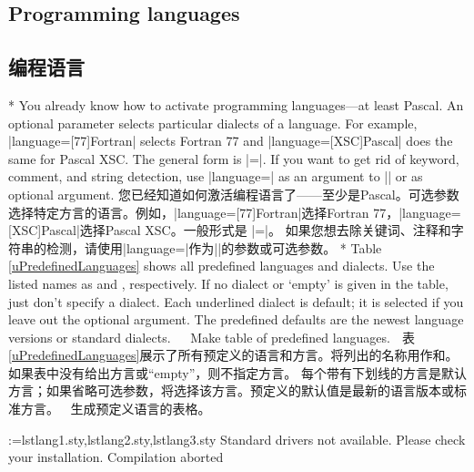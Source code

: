 \begin{paracol}{2}
\subsection{Programming languages}\label{uProgrammingLanguages}
\switchcolumn
\subsection{编程语言}
\switchcolumn[0]*%
You already know how to activate programming languages---at least Pascal.
An optional parameter selects particular dialects of a language. For example,
|language=[77]Fortran| selects Fortran 77 and |language=[XSC]Pascal| does the
same for Pascal XSC. The general form is
   {\rstyle{}}|=|.
If you want to get rid of keyword, comment, and string detection, use
|language={}| as an argument to |\lstset| or as optional argument.
\switchcolumn
您已经知道如何激活编程语言了——至少是Pascal。可选参数选择特定方言的语言。例如，|language=[77]Fortran|选择Fortran 77，|language=[XSC]Pascal|选择Pascal XSC。一般形式是
{\rstyle{}}|=|。
如果您想去除关键词、注释和字符串的检测，请使用|language={}|作为|\lstset|的参数或可选参数。
\switchcolumn[0]*%
Table \ref{uPredefinedLanguages} shows all predefined languages and dialects.
Use the listed names as  and , respectively. If
no dialect or `empty' is given in the table, just don't specify a dialect.
Each underlined dialect is default; it is selected if you leave out
the optional argument. The predefined defaults are the newest language
versions or standard dialects.
^^A
^^A  Make table of predefined languages.
^^A
\switchcolumn
表\ref{uPredefinedLanguages}展示了所有预定义的语言和方言。将列出的名称用作和。如果表中没有给出方言或“empty”，则不指定方言。
每个带有下划线的方言是默认方言；如果省略可选参数，将选择该方言。预定义的默认值是最新的语言版本或标准方言。
^^A
^^A 生成预定义语言的表格。
^^A
\end{paracol}
\let\lstlanguages\empty
\makeatletter
\@for\lst@temp:={lstlang1.sty,lstlang2.sty,lstlang3.sty}\do
   {\IfFileExists\lst@temp{}{\let\lstlanguages\relax}}
\makeatother
\ifx\lstlanguages\relax
       {Standard drivers not available.\MessageBreak
        Please check your installation.\MessageBreak
        Compilation aborted}
